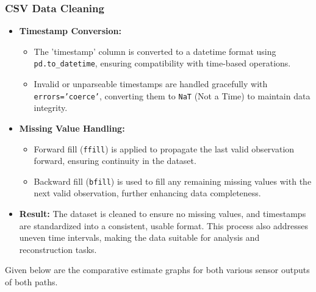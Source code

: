 \documentclass[a4paper]{article}
\begin{document}
\subsubsection*{CSV Data Cleaning}
\begin{itemize}
    \item \textbf{Timestamp Conversion:} 
    \begin{itemize}
        \item The 'timestamp' column is converted to a datetime format using \texttt{pd.to\_datetime}, ensuring compatibility with time-based operations.
        \item Invalid or unparseable timestamps are handled gracefully with \texttt{errors='coerce'}, converting them to \texttt{NaT} (Not a Time) to maintain data integrity.
    \end{itemize}
    \item \textbf{Missing Value Handling:}
    \begin{itemize}
        \item Forward fill (\texttt{ffill}) is applied to propagate the last valid observation forward, ensuring continuity in the dataset.
        \item Backward fill (\texttt{bfill}) is used to fill any remaining missing values with the next valid observation, further enhancing data completeness.
    \end{itemize}
    \item \textbf{Result:} The dataset is cleaned to ensure no missing values, and timestamps are standardized into a consistent, usable format. This process also addresses uneven time intervals, making the data suitable for analysis and reconstruction tasks.
\end{itemize}
Given below are the comparative estimate graphs for both various sensor outputs of both paths.
\end{document}
